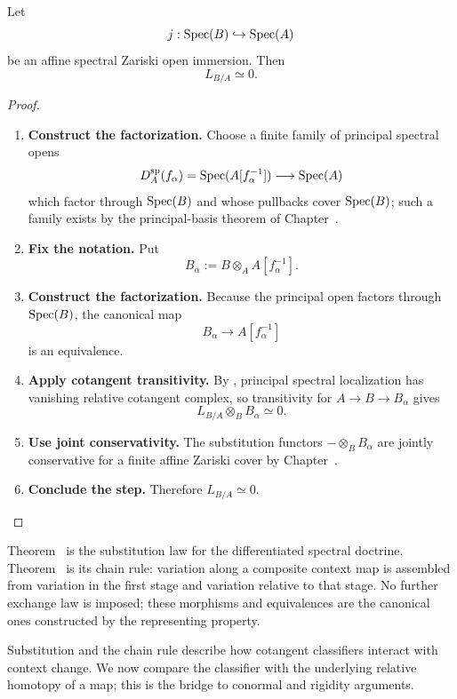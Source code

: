 \begin{proposition}
\label{prop:affine-open-cotangent-zero}
Let
\[
    j:\operatorname{Spec}(B)\hookrightarrow\operatorname{Spec}(A)
\]
be an affine spectral Zariski open immersion. Then
\[
    L_{B/A}\simeq0.
\]
\end{proposition}

\begin{proof}
\leavevmode
\begin{enumerate}[label=\textup{(\arabic*)}]
    \item \textbf{Construct the factorization.}
    Choose a finite family of principal spectral opens
    \[
        D_A^{\mathrm{sp}}(f_\alpha)=\operatorname{Spec}(A[f_\alpha^{-1}])
        \longrightarrow
        \operatorname{Spec}(A)
    \]
    which factor through \(\operatorname{Spec}(B)\) and whose pullbacks cover \(\operatorname{Spec}(B)\); such a family exists
    by the principal-basis theorem of Chapter~.

    \item \textbf{Fix the notation.}
    Put
    \[
        B_\alpha:=B\otimes_AA[f_\alpha^{-1}].
    \]

    \item \textbf{Construct the factorization.}
    Because the principal open factors through \(\operatorname{Spec}(B)\), the canonical map
    \[
        B_\alpha\longrightarrow A[f_\alpha^{-1}]
    \]
    is an equivalence.

    \item \textbf{Apply cotangent transitivity.}
    By , principal spectral localization has
    vanishing relative cotangent complex, so transitivity for \(A\to B\to B_\alpha\) gives
    \[
        L_{B/A}\otimes_BB_\alpha\simeq0.
    \]

    \item \textbf{Use joint conservativity.}
    The substitution functors \(-\otimes_BB_\alpha\) are jointly conservative for a finite affine Zariski
    cover by Chapter~.

    \item \textbf{Conclude the step.}
    Therefore \(L_{B/A}\simeq0\).
\end{enumerate}
\end{proof}

\begin{remark}
\label{rem:cotangent-doctrinal-interpretation}
Theorem~ is the substitution law for the
differentiated spectral doctrine. Theorem~
is its chain rule: variation along a composite context map is assembled from
variation in the first stage and variation relative to that stage. No further exchange
law is imposed; these morphisms and equivalences are the canonical ones
constructed by the representing property.
\end{remark}
Substitution and the chain rule describe how cotangent classifiers interact
with context change. We now compare the classifier with the underlying
relative homotopy of a map; this is the bridge to conormal and rigidity
arguments.

